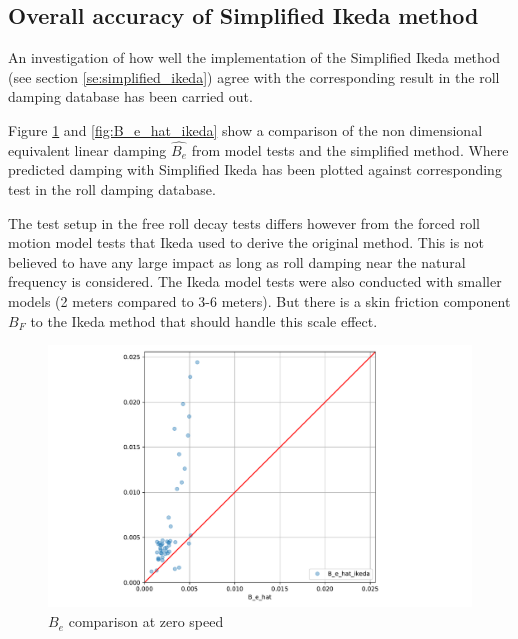 \subsection{Overall accuracy of Simplified Ikeda method}
\label{se:overall_comparison}
An investigation of how well the implementation of the Simplified Ikeda method (see section \ref{se:simplified_ikeda}) agree with the corresponding result in the roll damping database has been carried out.

Figure \ref{fig:B_e_hat_ikeda_zero} and \ref{fig:B_e_hat_ikeda} show a comparison of the non dimensional equivalent linear damping $\hat{B_e}$
from model tests and the simplified method. Where predicted damping with Simplified Ikeda has been plotted against corresponding test in the roll damping database.  

The test setup in the free roll decay tests differs however from the forced roll motion model tests that Ikeda \parencite{ikeda_velocity_1979} used to derive the original method. This is not believed to have any large impact as long as roll damping near the natural frequency is considered. The Ikeda model tests were also conducted with smaller models (2 meters compared to 3-6 meters). But there is a skin friction component $B_F$ to the Ikeda method that should handle this scale effect.

\begin{figure}[H]
    \centering
    \includegraphics[width=0.9\columnwidth]{figures/B_e_hat_ikeda_zero.pdf}
    \caption{$\hat{B_e}$ comparison at zero speed}
    \label{fig:B_e_hat_ikeda_zero}
\end{figure}

